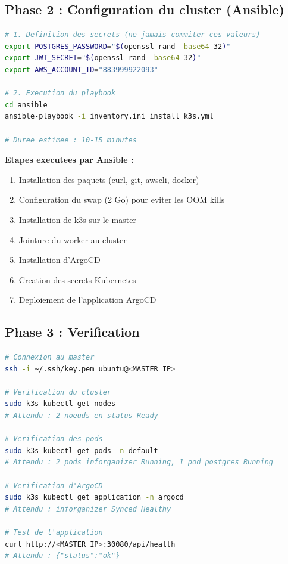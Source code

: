 \documentclass[12pt,a4paper,french]{report}
\begin{document}
\subsection{Phase 2 : Configuration du cluster (Ansible)}

\begin{lstlisting}[language=bash, caption=Execution Ansible]
# 1. Definition des secrets (ne jamais commiter ces valeurs)
export POSTGRES_PASSWORD="$(openssl rand -base64 32)"
export JWT_SECRET="$(openssl rand -base64 32)"
export AWS_ACCOUNT_ID="883999922093"

# 2. Execution du playbook
cd ansible
ansible-playbook -i inventory.ini install_k3s.yml

# Duree estimee : 10-15 minutes
\end{lstlisting}

\textbf{Etapes executees par Ansible :}
\begin{enumerate}
    \item Installation des paquets (curl, git, awscli, docker)
    \item Configuration du swap (2 Go) pour eviter les OOM kills
    \item Installation de k3s sur le master
    \item Jointure du worker au cluster
    \item Installation d'ArgoCD
    \item Creation des secrets Kubernetes
    \item Deploiement de l'application ArgoCD
\end{enumerate}

\subsection{Phase 3 : Verification}

\begin{lstlisting}[language=bash, caption=Commandes de verification]
# Connexion au master
ssh -i ~/.ssh/key.pem ubuntu@<MASTER_IP>

# Verification du cluster
sudo k3s kubectl get nodes
# Attendu : 2 noeuds en status Ready

# Verification des pods
sudo k3s kubectl get pods -n default
# Attendu : 2 pods inforganizer Running, 1 pod postgres Running

# Verification d'ArgoCD
sudo k3s kubectl get application -n argocd
# Attendu : inforganizer Synced Healthy

# Test de l'application
curl http://<MASTER_IP>:30080/api/health
# Attendu : {"status":"ok"}
\end{lstlisting}
\end{document}
